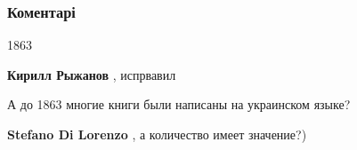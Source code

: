 
 
 
 
 
\subsubsection{Коментарі}
\label{sec:30_07_2021.fb.buzhanskii_max.1.valuev_cirkuljar.cmt}

\begin{itemize}
 
1863

\begin{itemize}
 
\textbf{Кирилл Рыжанов} , испрвавил
\end{itemize}

 
А до 1863 многие книги были написаны на украинском языке?
\begin{itemize}
 
\textbf{Stefano Di Lorenzo} , а количество имеет значение?)

 

\end{itemize}
\end{itemize}
